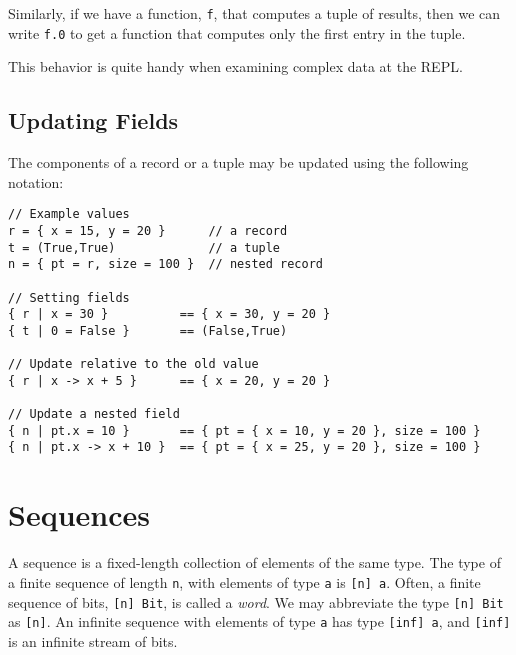 Similarly, if we have a function, \texttt{f}, that computes a tuple of
results, then we can write \texttt{f.0} to get a function that computes
only the first entry in the tuple.

This behavior is quite handy when examining complex data at the REPL.

\hypertarget{updating-fields}{%
\subsection{Updating Fields}\label{updating-fields}}

The components of a record or a tuple may be updated using the following
notation:

\begin{verbatim}
// Example values
r = { x = 15, y = 20 }      // a record
t = (True,True)             // a tuple
n = { pt = r, size = 100 }  // nested record

// Setting fields
{ r | x = 30 }          == { x = 30, y = 20 }
{ t | 0 = False }       == (False,True)

// Update relative to the old value
{ r | x -> x + 5 }      == { x = 20, y = 20 }

// Update a nested field
{ n | pt.x = 10 }       == { pt = { x = 10, y = 20 }, size = 100 }
{ n | pt.x -> x + 10 }  == { pt = { x = 25, y = 20 }, size = 100 }
\end{verbatim}

\hypertarget{sequences}{%
\section{Sequences}\label{sequences}}

A sequence is a fixed-length collection of elements of the same type.
The type of a finite sequence of length \texttt{n}, with elements of
type \texttt{a} is \texttt{{[}n{]}\ a}. Often, a finite sequence of
bits, \texttt{{[}n{]}\ Bit}, is called a \emph{word}. We may abbreviate
the type \texttt{{[}n{]}\ Bit} as \texttt{{[}n{]}}. An infinite sequence
with elements of type \texttt{a} has type \texttt{{[}inf{]}\ a}, and
\texttt{{[}inf{]}} is an infinite stream of bits.

